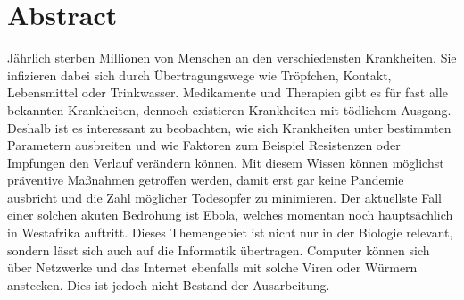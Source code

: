 \section*{Abstract}
Jährlich sterben Millionen von Menschen an den verschiedensten Krankheiten. Sie infizieren dabei sich durch Übertragungswege wie Tröpfchen, Kontakt, Lebensmittel oder Trinkwasser. Medikamente und Therapien gibt es für fast alle bekannten Krankheiten, dennoch existieren Krankheiten mit tödlichem Ausgang. 
Deshalb ist es interessant zu beobachten, wie sich Krankheiten unter bestimmten Parametern ausbreiten und wie Faktoren zum Beispiel Resistenzen oder Impfungen den Verlauf verändern können. Mit diesem Wissen können möglichst präventive Maßnahmen getroffen werden, damit erst gar keine Pandemie ausbricht und die Zahl möglicher Todesopfer zu minimieren. Der aktuellste Fall einer solchen akuten Bedrohung ist Ebola, welches momentan noch hauptsächlich in Westafrika auftritt. Dieses Themengebiet ist nicht nur in der Biologie relevant, sondern lässt sich auch auf die Informatik übertragen. Computer können sich über Netzwerke und das Internet ebenfalls mit solche Viren oder Würmern anstecken. Dies ist jedoch nicht Bestand der Ausarbeitung.